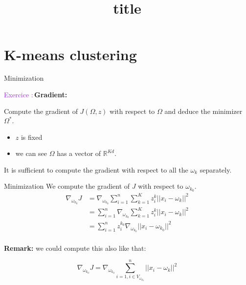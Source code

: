 \documentclass[usenames,dvipsnames]{beamer}
\title[FTML]{title}
\date{} %
\newcounter{numexos}%
\newcommand{\exercice}[1]{%
\addtocounter{numexos}{1}%
\textcolor{DarkOrchid}{Exercice\,\thenumexos\,:}\,#1%
}
\begin{document}
\begin{frame}
\titlepage %
\end{frame}

\section{K-means clustering}

\begin{frame}{Minimization}

    \exercice{\textbf{Gradient:}}

    Compute the gradient of $J(\Omega, z)$ with respect to $\Omega$ and deduce the minimizer $\Omega^*$.
    \begin{itemize}
        \item $z$ is fixed
	\item we can see $\Omega$ has a vector of $ \mathbb{R}^{Kd}$.
    \end{itemize}

    It is sufficient to compute the gradient with respect to all the $\omega_k$ separately.
\end{frame}


\begin{frame}{Minimization}
    We compute the gradient of $J$ with respect to $\omega_{k_0}$.
    \begin{equation}
        \begin{aligned}
            \label{eq:}
	    \nabla_{\omega_{k_0}}J &= \nabla_{\omega_{k_0}}\sum^{n}_{i=1} \sum^{K}_{k=1} z_i^k||x_i-\omega_k||^2\\
	    &= \sum^{n}_{i=1} \nabla_{\omega_{k_0}}\sum^{K}_{k=1} z_i^k||x_i-\omega_k||^2\\
	    &= \sum^{n}_{i=1} z_i^{k_0}\nabla_{\omega_{k_0}} ||x_i-\omega_{k_0}||^2\\
        \end{aligned}
    \end{equation}

    \textbf{Remark:} we could compute this also like that:

    \begin{equation}
	\nabla_{\omega_{k_0}}J= \nabla_{\omega_{k_0}}\sum^{n}_{i=1, i\in V_{\omega_{k_{0}}}} ||x_i-\omega_k||^2
    \end{equation}
\end{frame}
\end{document}
